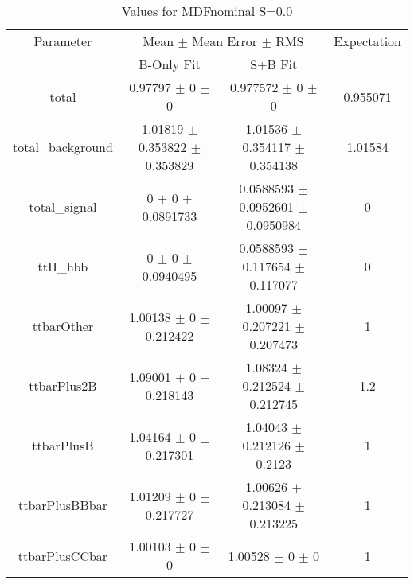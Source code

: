 \begin{table}
\centering
\caption{Values for MDFnominal S=0.0}
\begin{tabular}{cccc}
\toprule
Parameter & \multicolumn{2}{c}{Mean $\pm$ Mean Error $\pm$ RMS} & Expectation\\
 & B-Only Fit & S+B Fit & \\
\midrule
total & \num{0.97797} $\pm$ \num{0} $\pm$ \num{0} & \num{0.977572} $\pm$ \num{0} $\pm$ \num{0} & \num{0.955071}\\
total\_background & \num{1.01819} $\pm$ \num{0.353822} $\pm$ \num{0.353829} & \num{1.01536} $\pm$ \num{0.354117} $\pm$ \num{0.354138} & \num{1.01584}\\
total\_signal & \num{0} $\pm$ \num{0} $\pm$ \num{0.0891733} & \num{0.0588593} $\pm$ \num{0.0952601} $\pm$ \num{0.0950984} & \num{0}\\
ttH\_hbb & \num{0} $\pm$ \num{0} $\pm$ \num{0.0940495} & \num{0.0588593} $\pm$ \num{0.117654} $\pm$ \num{0.117077} & \num{0}\\
ttbarOther & \num{1.00138} $\pm$ \num{0} $\pm$ \num{0.212422} & \num{1.00097} $\pm$ \num{0.207221} $\pm$ \num{0.207473} & \num{1}\\
ttbarPlus2B & \num{1.09001} $\pm$ \num{0} $\pm$ \num{0.218143} & \num{1.08324} $\pm$ \num{0.212524} $\pm$ \num{0.212745} & \num{1.2}\\
ttbarPlusB & \num{1.04164} $\pm$ \num{0} $\pm$ \num{0.217301} & \num{1.04043} $\pm$ \num{0.212126} $\pm$ \num{0.2123} & \num{1}\\
ttbarPlusBBbar & \num{1.01209} $\pm$ \num{0} $\pm$ \num{0.217727} & \num{1.00626} $\pm$ \num{0.213084} $\pm$ \num{0.213225} & \num{1}\\
ttbarPlusCCbar & \num{1.00103} $\pm$ \num{0} $\pm$ \num{0} & \num{1.00528} $\pm$ \num{0} $\pm$ \num{0} & \num{1}\\
\bottomrule
\end{tabular}
\end{table}